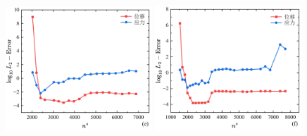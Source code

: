 \begin{figure}[!h]
\begin{subcaptiongroup}
    \label{Q8-l2-ns16}
    \end{subcaptiongroup}
    \begin{subcaptiongroup}
    \includegraphics[width=0.49\textwidth]{figures/shearlocking/T6-l2-ns32.png}
    \label{T6-l2-ns32}
    \includegraphics[width=0.49\textwidth]{figures/shearlocking/Q8-l2-ns32.png}
    \label{Q8-l2-ns32}
    \end{subcaptiongroup}
\caption{}
\label{ch_5:fig:quad_ns}
\end{figure}

